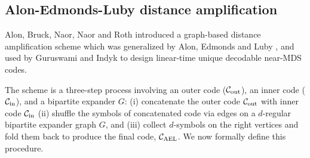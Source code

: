 

\subsection{Alon-Edmonds-Luby distance amplification}\label{sec:AEL_prelims}


Alon, Bruck, Naor, Naor and Roth \cite{ABNNR92} introduced a graph-based distance amplification scheme which was generalized by Alon, Edmonds and Luby \cite{AEL95}, and used by Guruswami and Indyk \cite{GI05} to design linear-time unique decodable near-MDS codes.

The scheme is a three-step process involving an outer code  (${\mathcal C}_{\mathrm{out}}$), an inner code (${\mathcal C}_{\mathrm{in}}$), and a bipartite expander $G$: (i) concatenate the outer code ${\mathcal C}_{\mathrm{out}}$ with inner code ${\mathcal C}_{\mathrm{in}}$ (ii) shuffle the symbols of concatenated code via edges on a $d$-regular bipartite expander graph $G$, and (iii) collect $d$-symbols on the right vertices and fold them back to produce the final code, ${ {\mathcal C}_{\mathrm{AEL}} }$. We now formally define this procedure.

%
%
%
%	

